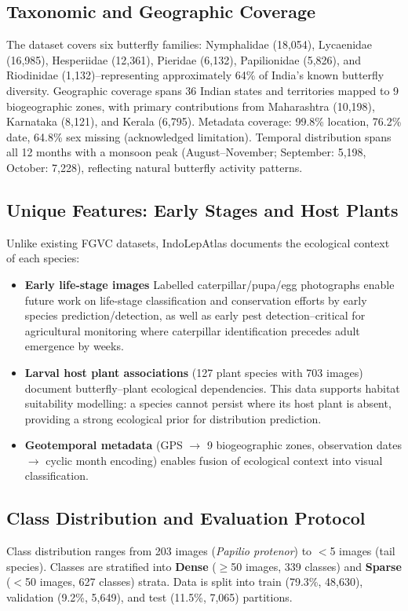 \documentclass[11pt]{article}
\begin{document}
\subsection{Taxonomic and Geographic Coverage}
The dataset covers six butterfly families: Nymphalidae (18,054), Lycaenidae (16,985), Hesperiidae (12,361), Pieridae (6,132), Papilionidae (5,826), and Riodinidae (1,132)--representing approximately 64\% of India's known butterfly diversity. Geographic coverage spans 36 Indian states and territories mapped to 9 biogeographic zones, with primary contributions from Maharashtra (10,198), Karnataka (8,121), and Kerala (6,795). Metadata coverage: 99.8\% location, 76.2\% date, 64.8\% sex missing (acknowledged limitation). Temporal distribution spans all 12 months with a monsoon peak (August--November; September: 5,198, October: 7,228), reflecting natural butterfly activity patterns.

\subsection{Unique Features: Early Stages and Host Plants}
Unlike existing FGVC datasets, IndoLepAtlas documents the ecological context of each species:
\begin{itemize}[nosep]
    \item \textbf{Early life-stage images} Labelled caterpillar/pupa/egg photographs enable future work on life-stage classification and conservation efforts by early species prediction/detection, as well as early pest detection--critical for agricultural monitoring where caterpillar identification precedes adult emergence by weeks.
    \item \textbf{Larval host plant associations} (127 plant species with 703 images) document butterfly--plant ecological dependencies. This data supports habitat suitability modelling: a species cannot persist where its host plant is absent, providing a strong ecological prior for distribution prediction.
    \item \textbf{Geotemporal metadata} (GPS $\to$ 9 biogeographic zones, observation dates $\to$ cyclic month encoding) enables fusion of ecological context into visual classification.
\end{itemize}

\subsection{Class Distribution and Evaluation Protocol}
Class distribution ranges from 203 images (\emph{Papilio protenor}) to $<$5 images (tail species). Classes are stratified into \textbf{Dense} ($\geq$50 images, 339 classes) and \textbf{Sparse} ($<$50 images, 627 classes) strata. Data is split into train (79.3\%, 48,630), validation (9.2\%, 5,649), and test (11.5\%, 7,065) partitions.
\end{document}
